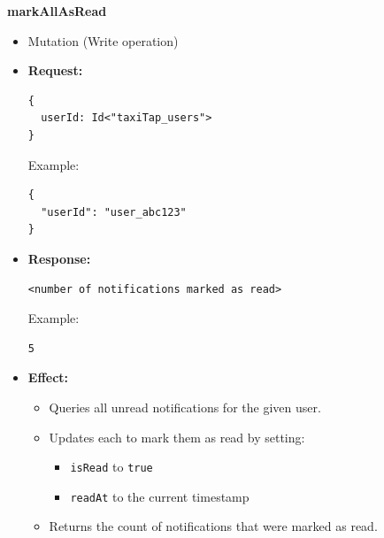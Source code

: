 \documentclass[a4paper,12pt]{article}
\begin{document}
\item \textbf{markAllAsRead}
  \begin{itemize}
    \item Mutation (Write operation)
    \item \textbf{Request:}
    \begin{verbatim}
{
  userId: Id<"taxiTap_users">
}
    \end{verbatim}
    Example:
    \begin{verbatim}
{
  "userId": "user_abc123"
}
    \end{verbatim}
    \item \textbf{Response:}
    \begin{verbatim}
<number of notifications marked as read>
    \end{verbatim}
    Example:
    \begin{verbatim}
5
    \end{verbatim}
    \item \textbf{Effect:}
    \begin{itemize}
      \item Queries all unread notifications for the given user.
      \item Updates each to mark them as read by setting:
        \begin{itemize}
          \item \texttt{isRead} to \texttt{true}
          \item \texttt{readAt} to the current timestamp
        \end{itemize}
      \item Returns the count of notifications that were marked as read.
    \end{itemize}
  \end{itemize}
\end{document}
